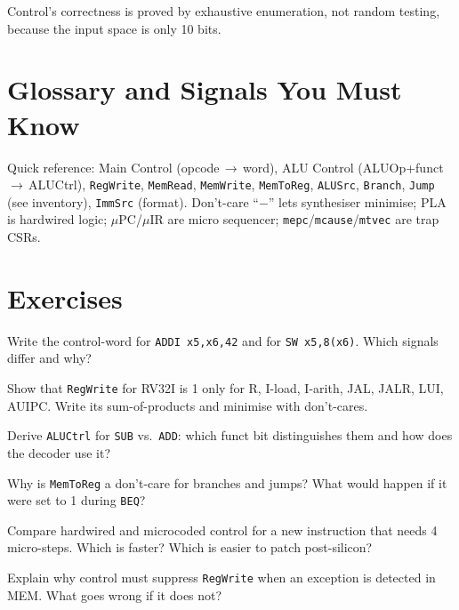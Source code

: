 Control's correctness is proved by exhaustive enumeration, not random testing, because the input space is only 10 bits.

\section{Glossary and Signals You Must Know}
Quick reference: Main Control (opcode\,$\to$\,word), ALU Control (ALUOp+funct\,$\to$\,ALUCtrl), \texttt{RegWrite}, \texttt{MemRead}, \texttt{MemWrite}, \texttt{MemToReg}, \texttt{ALUSrc}, \texttt{Branch}, \texttt{Jump} (see inventory), \texttt{ImmSrc} (format). Don't-care ``$-$'' lets synthesiser minimise; PLA is hardwired logic; $\mu$PC/$\mu$IR are micro sequencer; \texttt{mepc}/\texttt{mcause}/\texttt{mtvec} are trap CSRs.

\section{Exercises}
\begin{exercise}Write the control-word for \texttt{ADDI x5,x6,42} and for \texttt{SW x5,8(x6)}. Which signals differ and why?\end{exercise}
\begin{exercise}Show that \texttt{RegWrite} for RV32I is 1 only for R, I-load, I-arith, JAL, JALR, LUI, AUIPC. Write its sum-of-products and minimise with don't-cares.\end{exercise}
\begin{exercise}Derive \texttt{ALUCtrl} for \texttt{SUB} vs.\ \texttt{ADD}: which funct bit distinguishes them and how does the decoder use it?\end{exercise}
\begin{exercise}Why is \texttt{MemToReg} a don't-care for branches and jumps? What would happen if it were set to 1 during \texttt{BEQ}?\end{exercise}
\begin{exercise}Compare hardwired and microcoded control for a new instruction that needs 4 micro-steps. Which is faster? Which is easier to patch post-silicon?\end{exercise}
\begin{exercise}Explain why control must suppress \texttt{RegWrite} when an exception is detected in MEM. What goes wrong if it does not?\end{exercise}

